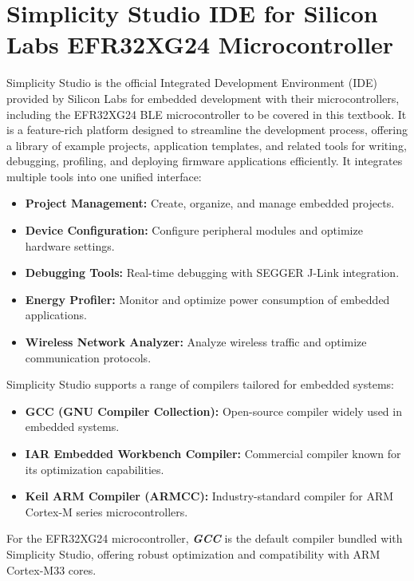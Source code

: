 \documentclass[
  9pt,
  letterpaper,
  abstract,
  titlepage]{scrbook}
\begin{document}
\section{Simplicity Studio IDE for Silicon Labs EFR32XG24
Microcontroller}\label{simplicity-studio-ide-for-silicon-labs-efr32xg24-microcontroller}

Simplicity Studio is the official Integrated Development Environment
(IDE) provided by Silicon Labs for embedded development with their
microcontrollers, including the EFR32XG24 BLE microcontroller to be
covered in this textbook. It is a feature-rich platform designed to
streamline the development process, offering a library of example
projects, application templates, and related tools for writing,
debugging, profiling, and deploying firmware applications efficiently.
It integrates multiple tools into one unified interface:

\begin{itemize}
\item
  \textbf{Project Management:} Create, organize, and manage embedded
  projects.
\item
  \textbf{Device Configuration:} Configure peripheral modules and
  optimize hardware settings.
\item
  \textbf{Debugging Tools:} Real-time debugging with SEGGER J-Link
  integration.
\item
  \textbf{Energy Profiler:} Monitor and optimize power consumption of
  embedded applications.
\item
  \textbf{Wireless Network Analyzer:} Analyze wireless traffic and
  optimize communication protocols.
\end{itemize}

Simplicity Studio supports a range of compilers tailored for embedded
systems:

\begin{itemize}
\item
  \textbf{GCC (GNU Compiler Collection):} Open-source compiler widely
  used in embedded systems.
\item
  \textbf{IAR Embedded Workbench Compiler:} Commercial compiler known
  for its optimization capabilities.
\item
  \textbf{Keil ARM Compiler (ARMCC):} Industry-standard compiler for ARM
  Cortex-M series microcontrollers.
\end{itemize}

For the EFR32XG24 microcontroller, \textbf{\emph{GCC}} is the default
compiler bundled with Simplicity Studio, offering robust optimization
and compatibility with ARM Cortex-M33 cores.
\end{document}
